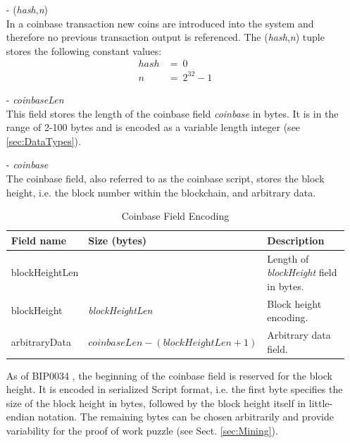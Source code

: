 \begin{itemize}
\item[-] (\textit{hash},\textit{n})~\\
In a coinbase transaction new coins are introduced into the system and therefore no previous transaction output is referenced. The (\textit{hash},\textit{n}) tuple stores the following constant values:
\begin{equation}
\begin{split}
hash &=\ 0 \\
n &=\ 2^{32}-1
\end{split}
\end{equation}

\item[-] \textit{coinbaseLen}~\\
This field stores the length of the coinbase field \textit{coinbase} in bytes. It is in the range of 2-100 bytes and is encoded as a variable length integer (see \ref{sec:DataTypes}).

\item[-] \textit{coinbase}~\\
The coinbase field, also referred to as the coinbase script, stores the block height, i.e. the block number within the blockchain, and arbitrary data.~\\

\vspace{-10pt}
\begin{table}

	\centering
	\begin{tabularx}{320pt}{| m{70pt} | >{\centering} m{80pt} | X |}
	\hline
	\textbf{Field name} &
	\textbf{Size (bytes)} &
	\textbf{Description} \\ \hline \hline
	
	blockHeightLen &
	1 &
	Length of \textit{blockHeight} field in bytes. \\ \hline
	
	blockHeight &
	\textit{blockHeightLen} &
	Block height encoding. \\ \hline
	
	arbitraryData &
	$\textit{coinbaseLen} - (\textit{blockHeightLen} + 1)$ &
	Arbitrary data field. \\ \hline
	
	\end{tabularx}
	\vspace{5pt}
	\caption{Coinbase Field Encoding}
	\label{tab:CoinbaseFieldEncoding}
\end{table}
\vspace{-20pt}

As of BIP0034 \cite{BIP0034}, the beginning of the coinbase field is reserved for the block height. It is encoded in serialized Script format, i.e. the first byte specifies the size of the block height in bytes, followed by the block height itself in little-endian notation. The remaining bytes can be chosen arbitrarily and provide variability for the proof of work puzzle (see Sect. \ref{sec:Mining}).
\end{itemize} 


